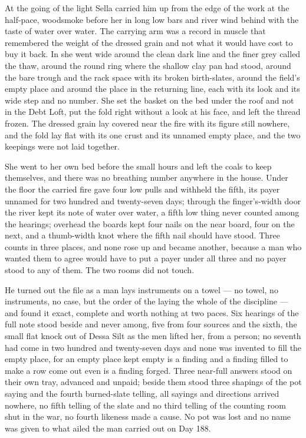 \scenebreak

At the going of the light Sella carried him up from the edge of the work at the half-pace, woodsmoke before her in long low bars and river wind behind with the taste of water over water. The carrying arm was a record in muscle that remembered the weight of the dressed grain and not what it would have cost to buy it back. In  she went wide around the clean dark line and the finer grey called the thaw, around the round ring where the shallow clay pan had stood, around the bare trough and the rack space with its broken birth-slates, around the field's empty place and around the place in the returning line, each with its look and its wide step and no number. She set the basket on the bed under the roof and not in the Debt Loft, put the fold right without a look at his face, and left the thread frozen. The dressed grain lay covered near the fire with its figure still nowhere, and the fold lay flat with its one crust and its unnamed empty place, and the two keepings were not laid together.

She went to her own bed before the small hours and left the coals to keep themselves, and there was no breathing number anywhere in the house. Under the floor the carried fire gave four low pulls and withheld the fifth, its payer unnamed for two hundred and twenty-seven days; through the finger's-width door the river kept its note of water over water, a fifth low thing never counted among the hearings; overhead the boards kept four nails on the near board, four on the next, and a thumb-width knot where the fifth nail should have stood. Three counts in three places, and none rose up and became another, because a man who wanted them to agree would have to put a payer under all three and no payer stood to any of them. The two rooms did not touch.

He turned out the file as a man lays instruments on a towel --- no towel, no instruments, no case, but the order of the laying the whole of the discipline --- and found it exact, complete and worth nothing at two paces. Six hearings of the full note stood beside and never among, five from four sources and the sixth, the small flat knock out of Dessa Silt as the men lifted her, from a person; no seventh had come in two hundred and twenty-seven days and none was invented to fill the empty place, for an empty place kept empty is a finding and a finding filled to make a row come out even is a finding forged. Three near-full answers stood on their own tray, advanced and unpaid; beside them stood three shapings of the pot saying and the fourth burned-slate telling, all sayings and directions arrived nowhere, no fifth telling of the slate and no third telling of the counting room shut in the war, no fourth likeness made a cause. No pot was lost and no name was given to what ailed the man carried out on Day 188.

